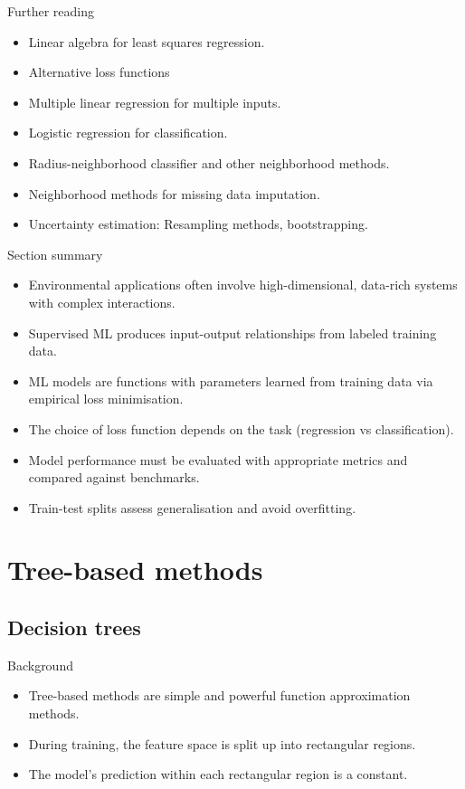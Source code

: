 \documentclass{beamer}
\begin{document}
\begin{frame}{Further reading}
\begin{itemize}
\item Linear algebra for least squares regression.
\item Alternative loss functions
\item Multiple linear regression for multiple inputs.
\item Logistic regression for classification.
\item Radius-neighborhood classifier and other neighborhood methods.
\item Neighborhood methods for missing data imputation.
\item Uncertainty estimation: Resampling methods, bootstrapping.
\end{itemize}
\end{frame}

\begin{frame}{Section summary}

\begin{itemize}
\item Environmental applications often involve high-dimensional, data-rich systems with complex interactions.
\item Supervised ML produces input-output relationships from labeled training data.
\item ML models are functions with parameters learned from training data via empirical loss minimisation.
\item The choice of loss function depends on the task (regression vs classification).
\item Model performance must be evaluated with appropriate metrics and compared against benchmarks.
\item Train-test splits assess generalisation and avoid overfitting.
\end{itemize}
\end{frame}


\section{Tree-based methods}

\subsection{Decision trees}

\begin{frame}{Background}
\begin{itemize}
\item Tree-based methods are simple and powerful function approximation methods.
\item During training, the feature space is split up into rectangular regions.
\item The model's prediction within each rectangular region is a constant.
\end{itemize}
\end{frame}
\end{document}
